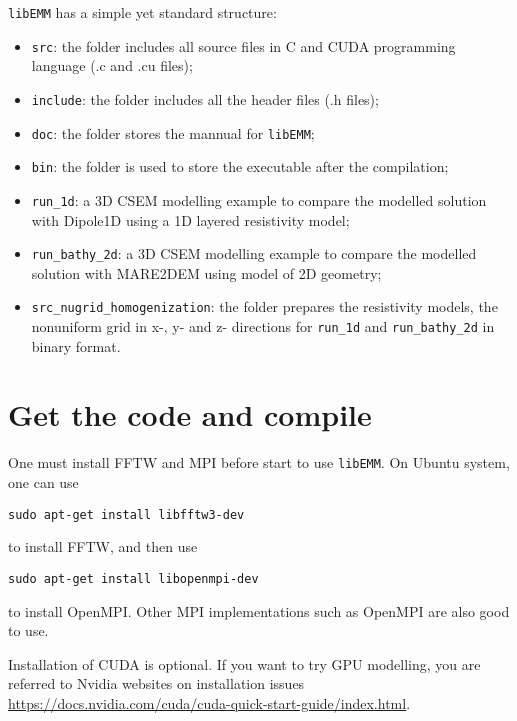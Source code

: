 \documentclass[10pt]{article}
\begin{document}
\verb|libEMM| has a simple yet standard structure:
\begin{itemize}
 \item \verb|src|: the folder includes all source files in C and CUDA programming language (.c and .cu files);
 
 \item \verb|include|: the folder includes all the header files (.h files);
 
 \item \verb|doc|: the folder stores the mannual for \verb|libEMM|;
 
 \item \verb|bin|: the folder is used to store the executable after the compilation;
 
 \item \verb|run_1d|: a 3D CSEM modelling example to compare the modelled solution with Dipole1D using a 1D layered resistivity model;
 
 \item \verb|run_bathy_2d|: a 3D CSEM modelling example to compare the modelled solution with MARE2DEM using model of 2D geometry;
 
 \item \verb|src_nugrid_homogenization|: the folder prepares the resistivity models, the nonuniform grid in x-, y- and z- directions for \verb|run_1d| and \verb|run_bathy_2d| in binary format.
\end{itemize}


\section{Get the code and compile}


One must install FFTW and MPI before start to use \verb|libEMM|. On Ubuntu system, one can use
\begin{verbatim}
sudo apt-get install libfftw3-dev
\end{verbatim}
to install FFTW, and then use
\begin{verbatim}
sudo apt-get install libopenmpi-dev
\end{verbatim}
to install OpenMPI. Other MPI implementations such as OpenMPI are also good to use.

Installation of CUDA is optional. If you want to try GPU modelling, you are referred to Nvidia websites on installation issues \url{https://docs.nvidia.com/cuda/cuda-quick-start-guide/index.html}.
\end{document}
